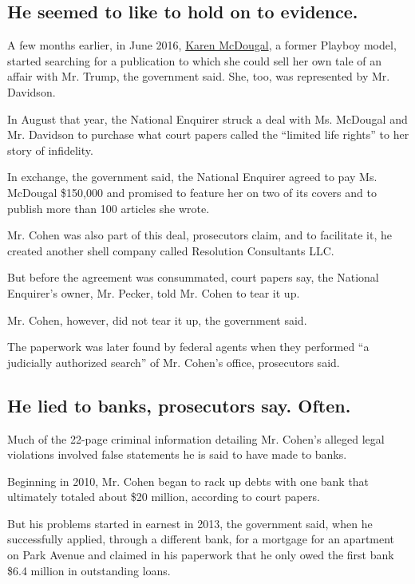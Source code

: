 \hypertarget{he-seemed-to-like-to-hold-on-to-evidence}{%
\subsection{He seemed to like to hold on to
evidence.}\label{he-seemed-to-like-to-hold-on-to-evidence}}

A few months earlier, in June 2016,
\href{https://www.nytimes.com/2018/03/22/us/politics/karen-mcdougal-interview.html}{Karen
McDougal}, a former Playboy model, started searching for a publication
to which she could sell her own tale of an affair with Mr. Trump, the
government said. She, too, was represented by Mr. Davidson.

In August that year, the National Enquirer struck a deal with Ms.
McDougal and Mr. Davidson to purchase what court papers called the
``limited life rights'' to her story of infidelity.

In exchange, the government said, the National Enquirer agreed to pay
Ms. McDougal \$150,000 and promised to feature her on two of its covers
and to publish more than 100 articles she wrote.

Mr. Cohen was also part of this deal, prosecutors claim, and to
facilitate it, he created another shell company called Resolution
Consultants LLC.

But before the agreement was consummated, court papers say, the National
Enquirer's owner, Mr. Pecker, told Mr. Cohen to tear it up.

Mr. Cohen, however, did not tear it up, the government said.

The paperwork was later found by federal agents when they performed ``a
judicially authorized search'' of Mr. Cohen's office, prosecutors said.

\hypertarget{he-lied-to-banks-prosecutors-say-often}{%
\subsection{He lied to banks, prosecutors say.
Often.}\label{he-lied-to-banks-prosecutors-say-often}}

Much of the 22-page criminal information detailing Mr. Cohen's alleged
legal violations involved false statements he is said to have made to
banks.

Beginning in 2010, Mr. Cohen began to rack up debts with one bank that
ultimately totaled about \$20 million, according to court papers.

But his problems started in earnest in 2013, the government said, when
he successfully applied, through a different bank, for a mortgage for an
apartment on Park Avenue and claimed in his paperwork that he only owed
the first bank \$6.4 million in outstanding loans.

